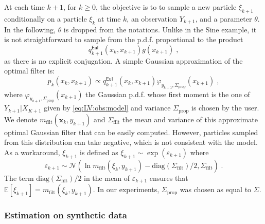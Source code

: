 \documentclass[12pt]{article}
\def\pE{\mathbb{E}}
\newcommand{\Sf}{\Sigma_{\text{filt}}}
\newcommand{\Sp}{\Sigma_{\text{prop}}}
\newcommand{\mf}{m_{\text{filt}}}
\newcommand{\eqsp}{\;}
\newcommand{\x}{\mathbf{x}}
\newcounter{example}[section]
\begin{document}
At each time ${k +1}$, for $k\geqslant 0$, the objective is to to sample a new particle $\xi_{k+1}$ conditionally on a particle $\xi_{k}$ at time $k$, an observation $Y_{k+1}$, and a parameter $\theta$. 
In the following,  $\theta$ is dropped from the notations. Unlike in the Sine example, it is not straightforward to sample from the p.d.f. proportional to the product
$$
q^{\mathsf{Eul}}_{k+1}(x_{k},x_{k+1})g(x_{k+1})\eqsp,
$$
as there is no explicit conjugation.
A simple  Gaussian approximation of the optimal filter is:
$$
p_{k}(x_{k},x_{k+1})\!\propto\! q^{\mathsf{Eul}}_{k+1}(x_{k},x_{k+1})\varphi_{y_{k+1}, \Sp}(x_{k+1})\eqsp,
$$
where $\varphi_{y_{k+1}, \Sp}(x_{k+1})$ the Gaussian p.d.f. whose first moment is the one of $Y_{k+1}\vert X_{K+1}$ given by \eqref{eq:LV:obs:model} and variance $\Sp$ is chosen by the user. We denote $ \mf(\x_{k}, y_{k+1})$ and $\Sf$ the mean and variance of this approximate optimal Gaussian filter that can be easily computed.
However, particles sampled from this distribution can take negative, which is not consistent with the model. 
As a workaround, $\xi_{k + 1}$ is defined as $\xi_{k+1} \sim\exp(\varepsilon_{k+1})$ where
$$
\varepsilon_{k+1} \sim \mathcal{N}\left(\ln \mf(\xi_{k}, y_{k+1}) - \text{diag}(\Sf)/2, \Sf\right)\eqsp .
$$
The term $\text{diag}(\Sf)/2$ in the mean of $\varepsilon_{k+1} $ ensures that $\pE\left[\xi_{k+1}\right] =  \mf(\xi_{k}, y_{k+1})$. In our experiments, $\Sp$ was chosen as equal to $\Sigma$.

\subsubsection*{Estimation on synthetic data}
\end{document}
